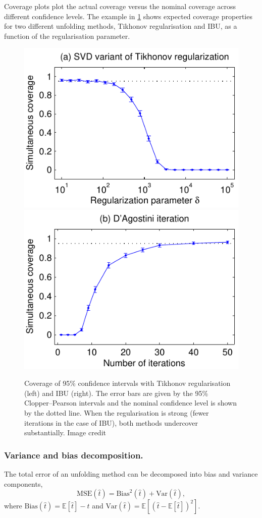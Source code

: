             Coverage plots plot the actual coverage versus the nominal coverage across different confidence levels.
            The example in \cref{fig:coverage} shows expected coverage properties for two different unfolding methods, Tikhonov regularisation and IBU, as a function of the regularisation parameter.
            \begin{figure}
                \centering
                \includegraphics[width=0.5\linewidth]{figures/chapter-02/incJets_lumFactor150nBinsE30nBinsF30JointCoverageSVD.pdf}\includegraphics[width=0.5\linewidth]{figures/chapter-02/incJets_lumFactor150nBinsE30nBinsF30JointCoverageDAgostini.pdf}
                \caption[Coverage properties of Tikhonov regularisation and IBU]{Coverage of 95\% confidence intervals with Tikhonov regularisation (left) and IBU (right).
                The error bars are given by the 95\% Clopper--Pearson intervals and the nominal confidence level is shown by the dotted line.
                When the regularisation is strong (fewer iterations in the case of IBU), both methods undercover substantially. Image credit~\cite{kuusela_shape-constrained_2017}}
                \label{fig:coverage}
            \end{figure}
    \subsubsection{Variance and bias decomposition.}
        The total error of an unfolding method can be decomposed into bias and variance components,
        \begin{equation}
        \text{MSE}(\hat{t}) = \text{Bias}^2(\hat{t}) + \text{Var}(\hat{t}),
        \end{equation}
        where \(\text{Bias}(\hat{t}) = \mathbb{E}[\hat{t}] - t\) and \(\text{Var}(\hat{t}) = \mathbb{E}[(\hat{t} - \mathbb{E}[\hat{t}])^2]\). 
        
